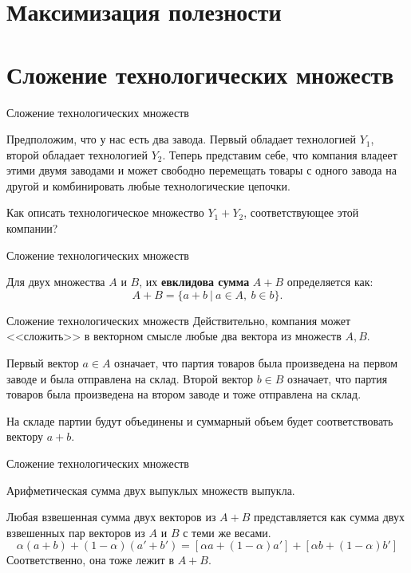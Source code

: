 \documentclass{beamer}
\begin{document}
\section{Максимизация полезности}

\section{Сложение технологических множеств}

\begin{frame}{Сложение технологических множеств}

Предположим, что у нас есть два завода. Первый обладает технологией $Y_1$, второй обладает технологией $Y_2$. Теперь представим себе, что компания владеет этими двумя заводами и может свободно перемещать товары с одного завода на другой и комбинировать любые технологические цепочки. 

Как описать технологическое множество $Y_1 + Y_2$, соответствующее этой компании?

\end{frame}

\begin{frame}{Сложение технологических множеств}

\begin{definition}
Для двух множества $A$ и $B$, их \textbf{евклидова сумма} $A+B$ определяется как:
$$ A+B = \{a + b \ | \ a \in A, \ b \in b\}.$$
\end{definition}
\end{frame}

\begin{frame}{Сложение технологических множеств}
Действительно, компания может <<сложить>> в векторном смысле любые два вектора из множеств $A, B$. 

Первый вектор $a \in A$ означает, что партия товаров была произведена на первом заводе и была отправлена на склад. Второй вектор $b \in B$ означает, что партия товаров была произведена на втором заводе и тоже отправлена на склад. 

На складе партии будут объединены и суммарный объем будет соответствовать вектору $a + b$.
\end{frame}

\begin{frame}{Сложение технологических множеств}
\begin{lemma}
Арифметическая сумма двух выпуклых множеств выпукла.
\end{lemma}
Любая взвешенная сумма двух векторов из $A+B$ представляется как сумма двух взвешенных пар векторов из $A$ и $B$ с теми же весами.
$$ \alpha(a + b) + (1-\alpha)(a'+b') = [\alpha a + (1-\alpha) a'] + [\alpha b + (1-\alpha) b']$$
Соответственно, она тоже лежит в $A + B$.
\end{frame}
\end{document}
